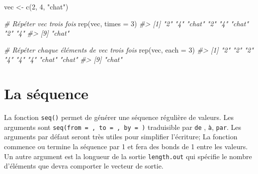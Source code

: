 \documentclass[
]{book}
\newenvironment{Shaded}{}{}
\newcommand{\AttributeTok}[1]{#1}
\newcommand{\CommentTok}[1]{\textit{#1}}
\newcommand{\DecValTok}[1]{#1}
\newcommand{\FunctionTok}[1]{#1}
\newcommand{\NormalTok}[1]{#1}
\newcommand{\OtherTok}[1]{#1}
\newcommand{\StringTok}[1]{#1}
\begin{document}
\begin{Shaded}
\begin{Highlighting}[]
\NormalTok{vec }\OtherTok{\textless{}{-}} \FunctionTok{c}\NormalTok{(}\DecValTok{2}\NormalTok{, }\DecValTok{4}\NormalTok{, }\StringTok{"chat"}\NormalTok{)}

\CommentTok{\# Répéter vec trois fois}
\FunctionTok{rep}\NormalTok{(vec, }\AttributeTok{times =} \DecValTok{3}\NormalTok{)}
\CommentTok{\#\textgreater{} [1] "2"    "4"    "chat" "2"    "4"    "chat" "2"    "4"   }
\CommentTok{\#\textgreater{} [9] "chat"}

\CommentTok{\# Répéter chaque éléments de vec trois fois}
\FunctionTok{rep}\NormalTok{(vec, }\AttributeTok{each =} \DecValTok{3}\NormalTok{)}
\CommentTok{\#\textgreater{} [1] "2"    "2"    "2"    "4"    "4"    "4"    "chat" "chat"}
\CommentTok{\#\textgreater{} [9] "chat"}
\end{Highlighting}
\end{Shaded}

\hypertarget{la-suxe9quence}{%
\section{La séquence}\label{la-suxe9quence}}

La fonction \texttt{seq()} permet de générer une séquence régulière de valeurs. Les arguments sont \texttt{seq(from\ =\ ,\ to\ =\ ,\ by\ =\ )} traduisible par \texttt{de} , \texttt{à}, \texttt{par}. Les arguments par défaut seront très utiles pour simplifier l'écriture; La fonction commence ou termine la séquence par 1 et fera des bonds de 1 entre les valeurs. Un autre argument est la longueur de la sortie \texttt{length.out} qui spécifie le nombre d'éléments que devra comporter le vecteur de sortie.
\end{document}
